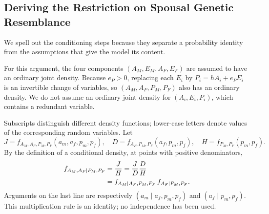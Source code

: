 \subsection{Deriving the Restriction on Spousal Genetic Resemblance}
\label{sec:model-spouses}

We spell out the conditioning steps because they separate a probability
identity from the assumptions that give the model its content.

For this argument, the four components $(A_M,E_M,A_F,E_F)$ are assumed
to have an ordinary joint density.
Because $e_P>0$, replacing each $E_i$ by $P_i=hA_i+e_P E_i$ is an invertible
change of variables, so $(A_M,A_F,P_M,P_F)$ also has an ordinary density.
We do not assume an ordinary joint density for $(A_i,E_i,P_i)$, which
contains a redundant variable.

Subscripts distinguish different density functions; lower-case letters
denote values of the corresponding random variables. Let
\[
 J=f_{A_M,A_F,P_M,P_F}(a_m,a_f,p_m,p_f),\quad
 D=f_{A_F,P_M,P_F}(a_f,p_m,p_f),\quad
 H=f_{P_M,P_F}(p_m,p_f).
\]
By the definition of a conditional density, at points with positive
denominators,
\begin{align}
 f_{A_M,A_F\mid P_M,P_F}
 &=\frac{J}{H}
   =\frac{J}{D}\frac{D}{H}\notag\\
 &=f_{A_M\mid A_F,P_M,P_F}\,
   f_{A_F\mid P_M,P_F}.
 \label{eq:model-multiplication}
\end{align}
Arguments on the last line are respectively
$(a_m\mid a_f,p_m,p_f)$ and $(a_f\mid p_m,p_f)$.
This multiplication rule is an identity; no independence has been used.

